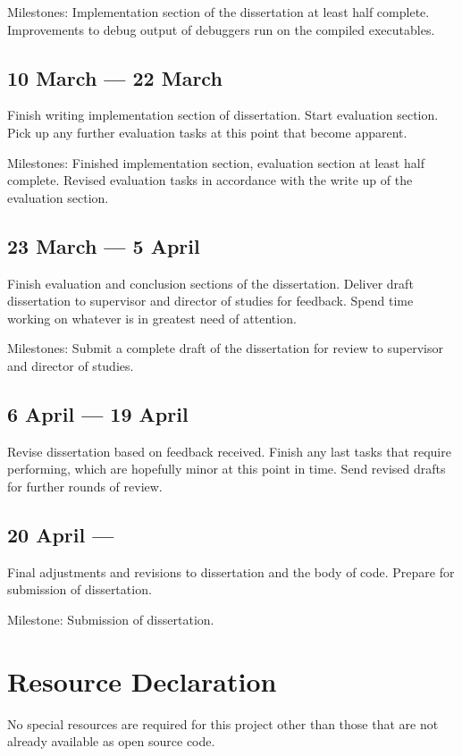 Milestones: Implementation section of the dissertation at least half complete.
Improvements to debug output of debuggers run on the compiled executables.

\subsection*{10 March --- 22 March}

Finish writing implementation section of dissertation. Start evaluation
section. Pick up any further evaluation tasks at this point that become
apparent.

Milestones: Finished implementation section, evaluation section at least half
complete. Revised evaluation tasks in accordance with the write up of the
evaluation section.

\subsection*{23 March --- 5 April}

Finish evaluation and conclusion sections of the dissertation. Deliver draft
dissertation to supervisor and director of studies for feedback. Spend time
working on whatever is in greatest need of attention.

Milestones: Submit a complete draft of the dissertation for review to
supervisor and director of studies.

\subsection*{6 April --- 19 April}

Revise dissertation based on feedback received. Finish any last tasks that
require performing, which are hopefully minor at this point in time. Send
revised drafts for further rounds of review.

\subsection*{20 April ---}

Final adjustments and revisions to dissertation and the body of code. Prepare
for submission of dissertation.

Milestone: Submission of dissertation.

\newpage

\section*{Resource Declaration}

No special resources are required for this project other than those that are
not already available as open source code.
